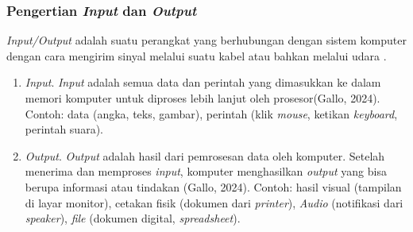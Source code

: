 \documentclass[12pt]{article}
\begin{document}
\subsubsection{Pengertian \textit{Input} dan \textit{Output}}
\textit{Input/Output} adalah suatu perangkat yang berhubungan dengan sistem komputer dengan cara mengirim sinyal melalui suatu kabel atau bahkan melalui udara .\\
\begin{enumerate}
    \item \textit{Input}.
    \textit{Input} adalah semua data dan perintah yang dimasukkan ke dalam memori komputer untuk diproses lebih lanjut oleh prosesor(Gallo, 2024).
    Contoh: data (angka, teks, gambar), perintah (klik \textit{mouse}, ketikan \textit{keyboard}, perintah suara).\\
    \item \textit{Output}.
    \textit{Output} adalah hasil dari pemrosesan data oleh komputer. Setelah menerima dan memproses \textit{input}, komputer menghasilkan \textit{output} yang bisa berupa informasi atau tindakan (Gallo, 2024).
    Contoh: hasil visual (tampilan di layar monitor), cetakan fisik (dokumen dari \textit{printer}), \textit{Audio} (notifikasi dari \textit{speaker}), \textit{file} (dokumen digital, \textit{spreadsheet}).\\
\end{enumerate}
\end{document}
